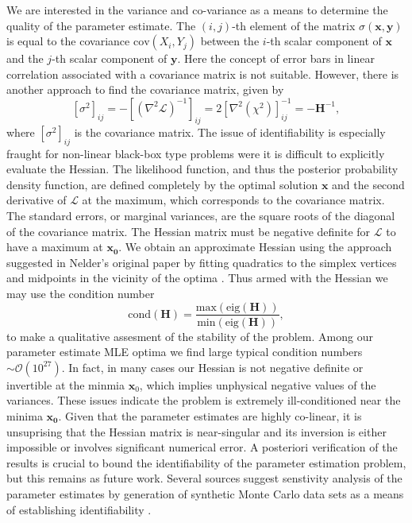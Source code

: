 \documentclass[12pt,a4paper,oneside]{book}
\begin{document}
We are interested in the variance and co-variance as a means to determine the quality of the parameter estimate. The $\left( i, j \right)$-th element of the matrix $\sigma (\mathbf{x}, \mathbf{y})$ is equal to the covariance $\mbox{cov}(X_i, Y_j)$ between the $i$-th scalar component of $\mathbf{x}$ and the $j$-th scalar component of $\mathbf{y}$. Here the concept of error bars in linear correlation associated with a covariance matrix is not suitable. However, there is another approach to find the covariance matrix, given by
\[ \left[\sigma^2 \right]_{ij} = -\left[ \left( \nabla^2 \mathcal{L}\right)^{-1}\right]_{ij} = 2 \left[ \nabla^2 \left( \chi^2\right)\right]_{ij}^{-1} = -\mathbf{H}^{-1},\]
where $\left[\sigma^2 \right]_{ij}$ is the covariance matrix. The issue of identifiability is especially fraught for non-linear black-box type problems were it is difficult to explicitly evaluate the Hessian. 
The likelihood function, and thus the posterior probability density function, are defined completely by the optimal solution $\mathbf{x}$ and the second derivative of $\mathcal{L}$ at the maximum, which corresponds to the covariance matrix. The standard errors, or marginal variances, are the square roots of the diagonal of the covariance matrix. The Hessian matrix must be negative definite for $\mathcal{L}$ to have a maximum at $\mathbf{x_0}$. We obtain an approximate Hessian using the approach suggested in Nelder's original paper by fitting quadratics to the simplex vertices and midpoints in the vicinity of the optima \cite{nelder_simplex_1965, spendley_sequential_1962}. Thus armed with the Hessian we may use the condition number
\[ \mbox{cond} (\mathbf{H}) = \frac{\mbox{max}(\mbox{eig}(\mathbf{H}))}{\mbox{min}(\mbox{eig}(\mathbf{H}))}, \]
to make a qualitative assesment of the stability of the problem. Among our parameter estimate MLE optima we find large typical condition numbers $\sim \mathcal{O}(10^{27})$. In fact, in many cases our Hessian is not negative definite or invertible at the minmia $\mathbf{x}_0$, which implies unphysical negative values of the variances. These issues indicate the problem is extremely ill-conditioned near the minima $\mathbf{x_0}$. Given that the parameter estimates are highly co-linear, it is unsuprising that the Hessian matrix is near-singular and its inversion is either impossible or involves significant numerical error. A posteriori verification of the results is crucial to bound the identifiability of the parameter estimation problem, but this remains as future work. Several sources suggest senstivity analysis of the parameter estimates by generation of synthetic Monte Carlo data sets as a means of establishing identifiability \cite{bevington_data_1969, jaqaman_linking_2006}.
\end{document}
